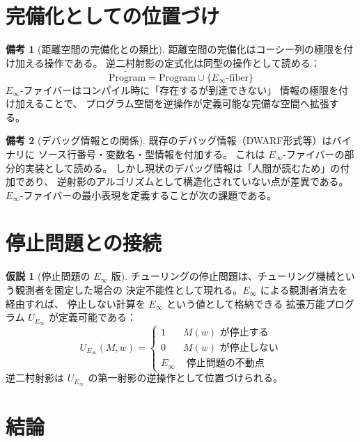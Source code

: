 \documentclass[11pt,a4paper]{article}
\newcommand{\Einfty}{E_\infty}
\theoremstyle{definition}
\newtheorem{remark}{備考}[section]
\newtheorem{hypothesis}{仮説}[section]
\begin{document}
\section{完備化としての位置づけ}

\begin{remark}[距離空間の完備化との類比]
距離空間の完備化はコーシー列の極限を付け加える操作である。
逆二村射影の定式化は同型の操作として読める：
$$\widetilde{\mathrm{Program}} = \mathrm{Program} \cup \{\Einfty\text{-fiber}\}$$
$\Einfty$-ファイバーはコンパイル時に「存在するが到達できない」
情報の極限を付け加えることで、
プログラム空間を逆操作が定義可能な完備な空間へ拡張する。
\end{remark}

\begin{remark}[デバッグ情報との関係]
既存のデバッグ情報（DWARF形式等）はバイナリに
ソース行番号・変数名・型情報を付加する。
これは $\Einfty$-ファイバーの部分的実装として読める。
しかし現状のデバッグ情報は「人間が読むため」の付加であり、
逆射影のアルゴリズムとして構造化されていない点が差異である。
$\Einfty$-ファイバーの最小表現を定義することが次の課題である。
\end{remark}

\section{停止問題との接続}

\begin{hypothesis}[停止問題の $\Einfty$ 版]
チューリングの停止問題は、チューリング機械という観測者を固定した場合の
決定不能性として現れる。$\Einfty$ による観測者消去を経由すれば、
停止しない計算を $\Einfty$ という値として格納できる
拡張万能プログラム $U_{\Einfty}$ が定義可能である：
$$U_{\Einfty}(M, w) = \begin{cases}
1 & M(w) \text{ が停止する} \\
0 & M(w) \text{ が停止しない} \\
\Einfty & \text{ 停止問題の不動点}
\end{cases}$$
逆二村射影は $U_{\Einfty}$ の第一射影の逆操作として位置づけられる。
\end{hypothesis}

\section{結論}
\end{document}
